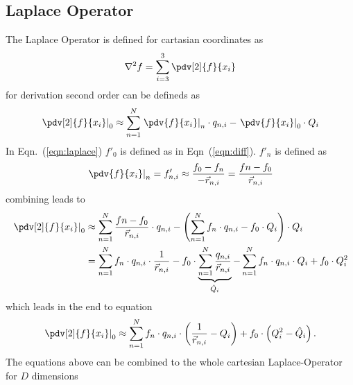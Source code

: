 \subsection{Laplace Operator}
The Laplace Operator is defined for cartasian coordinates as
\begin{equation}
	\nabla^2 f = \sum_{i = 3}^3 \pdv[2]{f}{x_i}
\end{equation}
for derivation second order can be defineds as
\begin{equation}
	\label{eqn:laplace}
	\left.\pdv[2]{f}{x_i}\right|_0 \approx \sum_{n = 1}^N \left.\pdv{f}{x_i} \right|_n \cdot q_{n, i} - \left.\pdv{f}{x_i} \right|_0  \cdot Q_i
\end{equation}
In Eqn.~(\ref{eqn:laplace}) $f'_0$ is defined as in Eqn~(\ref{eqn:diff}).
$f'_n$ is defined as
\begin{equation}
	\left.\pdv{f}{x_i} \right|_n = f'_{n, i} \approx \frac{f_0 - f_n}{-\vec{r}_{n, i}} = \frac{fn - f_0}{\vec{r}_{n, i}}
\end{equation}
combining leads to
\begin{align}
	\left.\pdv[2]{f}{x_i}\right|_0 &\approx \sum_{n = 1}^N \frac{fn - f_0}{\vec{r}_{n, i}} \cdot q_{n, i} - \left( \sum_{n = 1}^N f_n \cdot q_{n, i} - f_0 \cdot Q_i \right) \cdot Q_i \\
	&= \sum_{n = 1}^N f_n \cdot q_{n, i} \cdot \frac{1}{\vec{r}_{n, i}} - f_0 \cdot \underbrace{\sum_{n = 1}^N  \frac{q_{n, i}}{\vec{r}_{n, i}}}_{\hat{Q}_i} - \sum_{n = 1}^N f_n \cdot q_{n, i} \cdot Q_i + f_0 \cdot Q_i^2
\end{align}
which leads in the end to equation
\begin{equation}
	\left.\pdv[2]{f}{x_i}\right|_0 \approx \sum_{n = 1}^N f_n \cdot q_{n, i} \cdot \left( \frac{1}{\vec{r}_{n, i}} - Q_i \right) + f_0 \cdot \left( Q_i^2 - \hat{Q}_i \right).
\end{equation}
The equations above can be combined to the whole cartesian Laplace-Operator for $D$ dimensions
